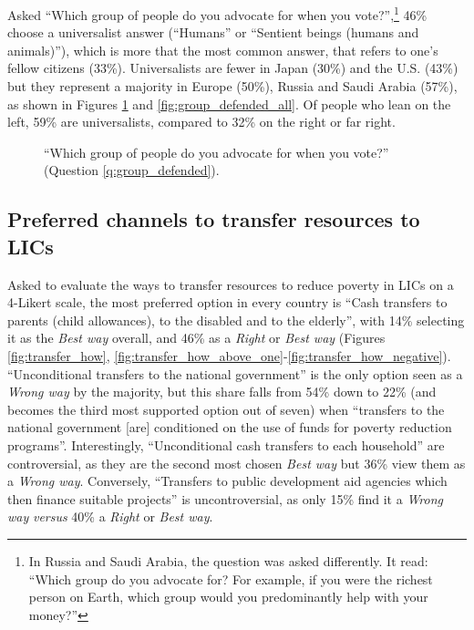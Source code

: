 \documentclass[12pt,english]{article}
\begin{document}
\begin{bibunit}
Asked ``Which group of people do you advocate for when you vote?'',\footnote{In Russia and Saudi Arabia, the question was asked differently. It read: ``Which group do you advocate for? For example, if you were the richest person on Earth, which group would you predominantly help with your money?''\label{fn:group_defended}} 
46\% choose a universalist answer (``Humans'' or ``Sentient beings (humans and animals)''), which is more that the most common answer, that refers to one's fellow citizens (33\%). Universalists are fewer in Japan (30\%) and the U.S. (43\%) but they represent a  majority in Europe (50\%), Russia and Saudi Arabia (57\%), as shown in Figures \ref{fig:group_defended} and \ref{fig:group_defended_all}.
Of people who lean on the left, 59\% are universalists, compared to 32\% on the right or far right. %

\begin{figure}[h!]
    \caption[Moral circle]{``Which group of people do you advocate for when you vote?'' (Question \ref{q:group_defended}).
    }\label{fig:group_defended}
\end{figure}

\subsection{Preferred channels to transfer resources to LICs}\label{subsec:transfer_how}

Asked to evaluate the ways to transfer resources to reduce poverty in LICs on a 4-Likert scale, the most preferred option in every country is ``Cash transfers to parents (child allowances), to the disabled and to the elderly'', with 14\% selecting it as the \textit{Best way} overall, and 46\% as a \textit{Right} or \textit{Best way} (Figures \ref{fig:transfer_how}, \ref{fig:transfer_how_above_one}-\ref{fig:transfer_how_negative}). ``Unconditional transfers to the national government'' is the only option seen as a \textit{Wrong way} by the majority, but this share falls from 54\% down to 22\% (and becomes the third most supported option out of seven) when ``transfers to the national government [are] conditioned on the use of funds for poverty reduction programs''. Interestingly, ``Unconditional cash transfers to each household'' are controversial, as they are the second most chosen \textit{Best way} but 36\% view them as a \textit{Wrong way}. Conversely, ``Transfers to public development aid agencies which then finance suitable projects'' is uncontroversial, as only 15\% find it a \textit{Wrong way} \textit{versus} 40\% a \textit{Right} or \textit{Best way}.


\end{bibunit}
\end{document}
